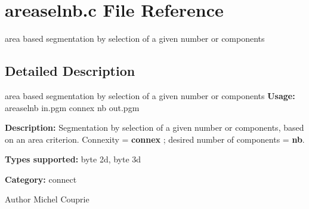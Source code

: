 \section{areaselnb.c File Reference}
\label{areaselnb_8c}


area based segmentation by selection of a given number or components  




\subsection{Detailed Description}
area based segmentation by selection of a given number or components {\bfseries Usage:} areaselnb in.pgm connex nb out.pgm

{\bfseries Description:} Segmentation by selection of a given number or components, based on an area criterion. Connexity = {\bfseries connex} ; desired number of components = {\bfseries nb}.

{\bfseries Types supported:} byte 2d, byte 3d

{\bfseries Category:} connect

\begin{DoxyAuthor}{Author}
Michel Couprie 
\end{DoxyAuthor}
